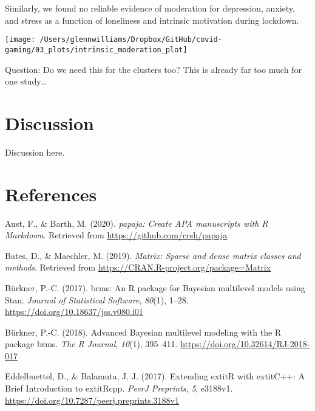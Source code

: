 \documentclass[
  english,
  jou,floatsintext]{apa6}
\begin{document}
Similarly, we found no reliable evidence of moderation for depression, anxiety, and stress as a function of loneliness and intrinsic motivation during lockdown.

\begin{figure*}[!htbp]

{\centering \texttt{[image: /Users/glennwilliams/Dropbox/GitHub/covid-gaming/03\_plots/intrinsic\_moderation\_plot]} 

}

\caption{ }\label{fig:intrinsic-moderation-plot}
\end{figure*}

Question: Do we need this for the clusters too? This is already far too much for one study\ldots{}

\hypertarget{discussion}{%
\section{Discussion}\label{discussion}}

Discussion here.

\newpage

\hypertarget{references}{%
\section{References}\label{references}}

\begingroup
\setlength{\parindent}{-0.5in}
\setlength{\leftskip}{0.5in}

\hypertarget{refs}{}
\leavevmode\hypertarget{ref-R-papaja}{}%
Aust, F., \& Barth, M. (2020). \emph{papaja: Create APA manuscripts with R Markdown}. Retrieved from \url{https://github.com/crsh/papaja}

\leavevmode\hypertarget{ref-R-Matrix}{}%
Bates, D., \& Maechler, M. (2019). \emph{Matrix: Sparse and dense matrix classes and methods}. Retrieved from \url{https://CRAN.R-project.org/package=Matrix}

\leavevmode\hypertarget{ref-R-brms_a}{}%
Bürkner, P.-C. (2017). brms: An R package for Bayesian multilevel models using Stan. \emph{Journal of Statistical Software}, \emph{80}(1), 1--28. \url{https://doi.org/10.18637/jss.v080.i01}

\leavevmode\hypertarget{ref-R-brms_b}{}%
Bürkner, P.-C. (2018). Advanced Bayesian multilevel modeling with the R package brms. \emph{The R Journal}, \emph{10}(1), 395--411. \url{https://doi.org/10.32614/RJ-2018-017}

\leavevmode\hypertarget{ref-R-Rcpp_b}{}%
Eddelbuettel, D., \& Balamuta, J. J. (2017). Extending extitR with extitC++: A Brief Introduction to extitRcpp. \emph{PeerJ Preprints}, \emph{5}, e3188v1. \url{https://doi.org/10.7287/peerj.preprints.3188v1}
\end{document}
